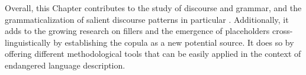 \documentclass[output=paper,colorlinks,citecolor=brown
\ChapterDOI{10.5281/zenodo.15697581}
]{langscibook}
\begin{document}
Overall, this Chapter contributes to the study of discourse and grammar, and the grammaticalization of salient discourse patterns in particular \citep{Ariel2009, Couper-Kuhlen&Thompson2008, DuBois2003}. 
Additionally, it adds to the growing research on fillers and the emergence of placeholders cross-linguistically by establishing the copula as a new potential source. 
It does so by offering different methodological tools that can be easily applied in the context of endangered language description. 


\printglossaries



\sloppy
\printbibliography[heading=subbibliography,notkeyword=this]
\end{document}
